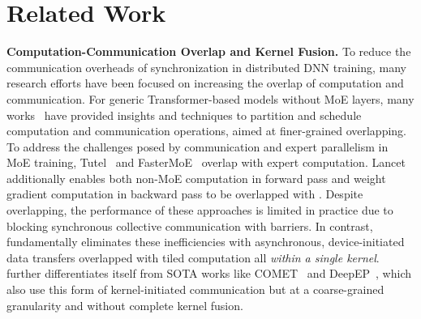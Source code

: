 \section{Related Work}
\label{sec:related}
\noindent\textbf{Computation-Communication Overlap and Kernel Fusion.}
To reduce the communication overheads of synchronization in distributed DNN training, many research efforts have been focused on
increasing the overlap of computation and communication.
For generic Transformer-based models without MoE layers,
many works~\cite{coconet,decomposition,centauri,t3,megascale,co2,syndicate,ccfuser,fused}
have provided insights and techniques to
partition and schedule computation and communication operations, aimed at
finer-grained overlapping.
To address the challenges posed by \alltoall communication and
expert parallelism in MoE training, Tutel~\cite{tutel} and FasterMoE~\cite{fastermoe}
overlap \alltoall with expert computation.
Lancet~\cite{lancet} additionally enables both non-MoE computation in
forward pass and weight gradient computation in backward pass to be overlapped with \alltoall.
Despite overlapping, the performance of these approaches is
limited in practice due to blocking synchronous collective communication with barriers.
In contrast, \sysname fundamentally
eliminates these inefficiencies with
asynchronous, device-initiated data transfers overlapped with tiled computation
all \emph{within a single kernel}.
\sysname further differentiates itself from SOTA works like COMET~\cite{comet} and DeepEP~\cite{deepep},
which also use this form of kernel-initiated communication but at a coarse-grained granularity
and without complete kernel fusion.

